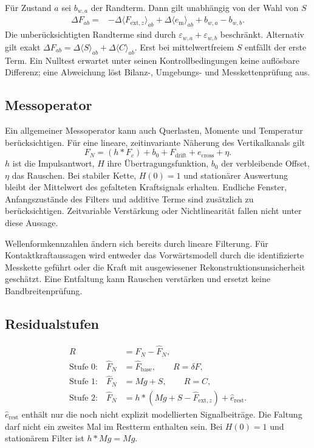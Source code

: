 \documentclass[11pt,a4paper]{article}
\begin{document}
Für Zustand $a$ sei $b_{w,a}$ der Randterm. Dann gilt unabhängig von der Wahl von $S$
\begin{align}
\Delta F_{ab}={}&-\Delta\langle F_{\mathrm{ext},z}\rangle_{ab}
+\Delta\langle e_{\mathrm m}\rangle_{ab}+b_{w,a}-b_{w,b}.
\label{eq:nulltest}
\end{align}
Die unberücksichtigten Randterme sind durch $\varepsilon_{w,a}+\varepsilon_{w,b}$ beschränkt. Alternativ gilt exakt $\Delta F_{ab}=\Delta\langle S\rangle_{ab}+\Delta\langle C\rangle_{ab}$. Erst bei mittelwertfreiem $S$ entfällt der erste Term. Ein Nulltest erwartet unter seinen Kontrollbedingungen keine auflösbare Differenz; eine Abweichung löst Bilanz-, Umgebungs- und Messkettenprüfung aus.

\subsection{Messoperator}
Ein allgemeiner Messoperator kann auch Querlasten, Momente und Temperatur berücksichtigen. Für eine lineare, zeitinvariante Näherung des Vertikalkanals gilt
\begin{equation}
F_N=(h*F_c)+b_0+F_{\mathrm{drift}}+e_{\mathrm{cross}}+\eta.
\label{eq:operator}
\end{equation}
$h$ ist die Impulsantwort, $H$ ihre Übertragungsfunktion, $b_0$ der verbleibende Offset, $\eta$ das Rauschen. Bei stabiler Kette, $H(0)=1$ und stationärer Auswertung bleibt der Mittelwert des gefalteten Kraftsignals erhalten. Endliche Fenster, Anfangszustände des Filters und additive Terme sind zusätzlich zu berücksichtigen. Zeitvariable Verstärkung oder Nichtlinearität fallen nicht unter diese Aussage.

Wellenformkennzahlen ändern sich bereits durch lineare Filterung. Für Kontaktkraftaussagen wird entweder das Vorwärtsmodell durch die identifizierte Messkette geführt oder die Kraft mit ausgewiesener Rekonstruktionsunsicherheit geschätzt. Eine Entfaltung kann Rauschen verstärken und ersetzt keine Bandbreitenprüfung.

\subsection{Residualstufen}
\begin{align}
R&=F_N-\hat F_N,\\
\text{Stufe 0:}\quad \hat F_N&=\hat F_{\mathrm{base}},\qquad R=\delta F,\\
\text{Stufe 1:}\quad \hat F_N&=Mg+S,\qquad R=C,\\
\text{Stufe 2:}\quad \hat F_N&=h*(Mg+S-\hat F_{\mathrm{ext},z})+\hat e_{\mathrm{rest}}.
\end{align}
$\hat e_{\mathrm{rest}}$ enthält nur die noch nicht explizit modellierten Signalbeiträge. Die Faltung darf nicht ein zweites Mal im Restterm enthalten sein. Bei $H(0)=1$ und stationärem Filter ist $h*Mg=Mg$.
\end{document}
